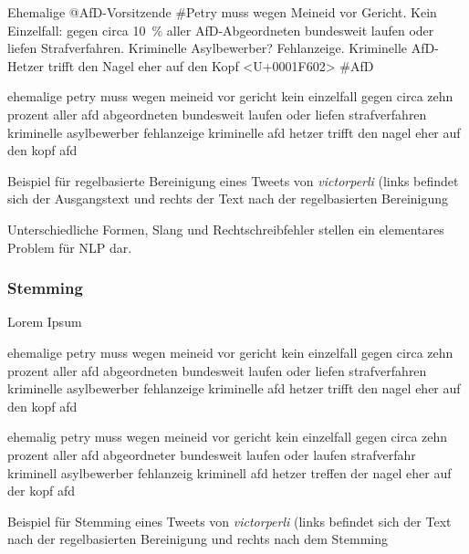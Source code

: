 \begin{code}[H]
    \begin{minipage}{0.45\textwidth}
        \small
        Ehemalige @AfD-Vorsitzende \#Petry muss wegen Meineid vor Gericht. Kein Einzelfall: gegen circa \SI{10}{\percent} aller AfD-Abgeordneten bundesweit laufen oder liefen Strafverfahren. Kriminelle Asylbewerber? Fehlanzeige. Kriminelle AfD-Hetzer trifft den Nagel eher auf den Kopf <U+0001F602> \#AfD
    \end{minipage}\hfill
    \begin{minipage}{0.45\textwidth}
        \small
        ehemalige petry muss wegen meineid vor gericht kein einzelfall gegen circa zehn prozent aller afd abgeordneten bundesweit laufen oder liefen strafverfahren kriminelle asylbewerber fehlanzeige kriminelle afd hetzer trifft den nagel eher auf den kopf afd
    \end{minipage}\hfill
    \caption[Beispiel -- Regelbasierte Bereinigung]{Beispiel für regelbasierte Bereinigung eines Tweets von \textit{victorperli} (links befindet sich der Ausgangstext und rechts der Text nach der regelbasierten Bereinigung} \label{list:rulebasedCleaning}
\end{code}

Unterschiedliche Formen, Slang und Rechtschreibfehler stellen ein elementares Problem für \ac{NLP} dar.

\subsubsection{Stemming}

Lorem Ipsum


\begin{code}[H]
    \begin{minipage}{0.45\textwidth}
        \small
        ehemalige petry muss wegen meineid vor gericht kein einzelfall gegen circa zehn prozent aller afd abgeordneten bundesweit laufen oder liefen strafverfahren kriminelle asylbewerber fehlanzeige kriminelle afd hetzer trifft den nagel eher auf den kopf afd
    \end{minipage}\hfill
    \begin{minipage}{0.45\textwidth}
        \small
        ehemalig petry muss wegen meineid vor gericht kein einzelfall gegen circa zehn prozent aller afd abgeordneter bundesweit laufen oder laufen strafverfahr kriminell asylbewerber fehlanzeig kriminell afd hetzer treffen der nagel eher auf der kopf afd
    \end{minipage}\hfill
    \caption[Beispiel -- Stemming]{Beispiel für Stemming eines Tweets von \textit{victorperli} (links befindet sich der Text nach der regelbasierten Bereinigung und rechts nach dem Stemming} \label{list:stemming}
\end{code}

